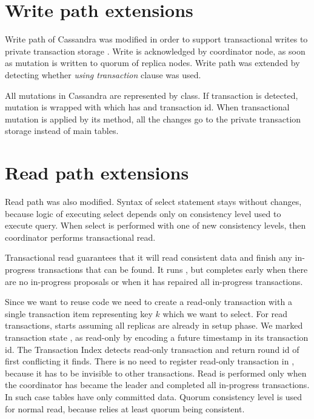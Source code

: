 \section{Write path extensions}
Write path of Cassandra \cite{CassandraWritePath} was modified in order to support transactional writes to private transaction storage \txStorage.
Write is acknowledged by coordinator node, as soon as mutation  is written to quorum of replica nodes.
Write path was extended by detecting whether \emph{using transaction} clause was used. 

All mutations in Cassandra are represented by  class. If transaction \transaction is detected, mutation is wrapped with  which has  and transaction id.
When transactional mutation is applied by its  method, all the changes go to the private transaction storage instead of main tables.

\section{Read path extensions}
Read path \cite{CassandraReadPath} was also modified. 
Syntax of select statement stays without changes, because logic of executing select depends only on consistency level used to execute query. When select is performed with one of new consistency levels, then coordinator performs transactional read.


Transactional read guarantees that it will read consistent data and finish any in-progress transactions that can be found. It runs \mpt, but completes early when there are no in-progress proposals or when it has repaired all in-progress transactions.


Since we want to reuse \mpt code we need to create a read-only transaction with a single transaction item \txItem representing key $k$ which we want to select. For read transactions, \mpt starts assuming all replicas are already in setup phase. 
We marked transaction state \txState, as read-only \txState by encoding a future timestamp in its transaction id.
The Transaction Index \txIndex detects read-only transaction and return \paxos round id \paxosRoundId of first conflicting \txState it finds. There is no need to register read-only transaction in \txIndex, because it has to be invisible to other transactions.
Read is performed only when the coordinator has became the leader and completed all in-progress transactions. In such case tables have only committed data. Quorum consistency level is used for normal read, because \mpt relies at least quorum being consistent.


